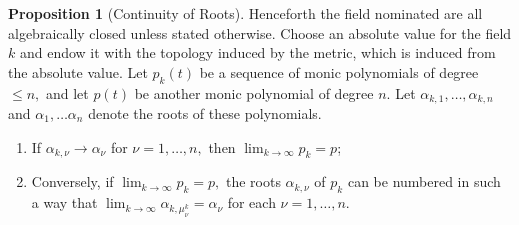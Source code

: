 \documentclass[10pt]{report}
\theoremstyle{definition}
\newtheorem{proposition}{Proposition}
\begin{document}
\begin{proposition}[Continuity of Roots]
Henceforth the field nominated are all algebraically closed unless stated otherwise.
Choose an absolute value for the field $k$ and endow it with the topology induced by the metric, which is induced from the absolute value.
Let $p_{k}(t)$ be a sequence of monic polynomials of degree $\leq n,$ and let $p(t)$ be another monic polynomial of degree $n .$ Let $\alpha_{k, 1}, \ldots, \alpha_{k, n}$ and $\alpha_{1}, \ldots \alpha_{n}$ denote the roots of these polynomials.
\begin{enumerate}
\item
If $\alpha_{k, \nu} \rightarrow \alpha_{\nu}$ for $\nu=1, \ldots, n,$ then $\lim_{k\to\infty}p_k=p$;
\item
Conversely, if $\lim_{k\to\infty}p_{k}=p,$ the roots $\alpha_{k, \nu}$ of $p_{k}$ can be numbered in such a way that $\lim_{k\to\infty}\alpha_{k, \mu^k_\nu}=\alpha_{\nu}$ for each $\nu=1, \ldots, n$.
\end{enumerate}
\end{proposition}
\end{document}
